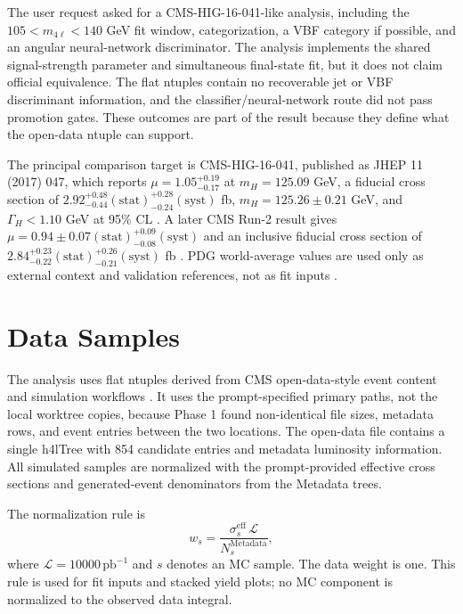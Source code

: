 \documentclass[11pt]{article}
\begin{document}
The user request asked for a CMS-HIG-16-041-like analysis, including the $105<m_{4\ell}<140$ GeV fit window, categorization, a VBF category if possible, and an angular neural-network discriminator. The analysis implements the shared signal-strength parameter and simultaneous final-state fit, but it does not claim official equivalence. The flat ntuples contain no recoverable jet or VBF discriminant information, and the classifier/neural-network route did not pass promotion gates. These outcomes are part of the result because they define what the open-data ntuple can support.

The principal comparison target is CMS-HIG-16-041, published as JHEP 11 (2017) 047, which reports $\mu=1.05^{+0.19}_{-0.17}$ at $m_H=125.09$ GeV, a fiducial cross section of $2.92^{+0.48}_{-0.44}\mathrm{(stat)}^{+0.28}_{-0.24}\mathrm{(syst)}$ fb, $m_H=125.26\pm0.21$ GeV, and $\Gamma_H<1.10$ GeV at 95\% CL \cite{CMS-HIG-16-041}. A later CMS Run-2 result gives $\mu=0.94\pm0.07\mathrm{(stat)}^{+0.09}_{-0.08}\mathrm{(syst)}$ and an inclusive fiducial cross section of $2.84^{+0.23}_{-0.22}\mathrm{(stat)}^{+0.26}_{-0.21}\mathrm{(syst)}$ fb \cite{CMS-HIG-19-001}. PDG world-average values are used only as external context and validation references, not as fit inputs \cite{PDG2024}.
\section{Data Samples}
The analysis uses flat ntuples derived from CMS open-data-style event content and simulation workflows \cite{CMSDetector,CMSOpenData,GEANT4,PYTHIA8,POWHEG}. It uses the prompt-specified primary paths, not the local worktree copies, because Phase 1 found non-identical file sizes, metadata rows, and event entries between the two locations. The open-data file contains a single h4lTree with 854 candidate entries and metadata luminosity information. All simulated samples are normalized with the prompt-provided effective cross sections and generated-event denominators from the Metadata trees.

The normalization rule is
\begin{equation}
 w_s = \frac{\sigma^{\mathrm{eff}}_s\,\mathcal{L}}{N^{\mathrm{Metadata}}_s},
 \label{eq:mc-weight}
\end{equation}
where $\mathcal{L}=10000\,\mathrm{pb}^{-1}$ and $s$ denotes an MC sample. The data weight is one. This rule is used for fit inputs and stacked yield plots; no MC component is normalized to the observed data integral.
\end{document}
